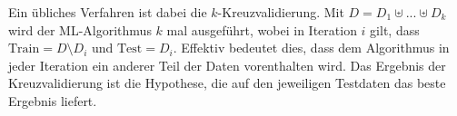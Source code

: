 Ein übliches Verfahren ist dabei die $k$-Kreuzvalidierung. Mit $D = D_1 \uplus ... \uplus D_k$ wird der ML-Algorithmus $k$ mal ausgeführt, wobei in Iteration $i$ gilt, dass $\text{Train} = D \setminus D_i$ und $\text{Test} = D_i$. Effektiv bedeutet dies, dass dem Algorithmus in jeder Iteration ein anderer Teil der Daten vorenthalten wird. Das Ergebnis der Kreuzvalidierung ist die Hypothese, die auf den jeweiligen Testdaten das beste Ergebnis liefert.

